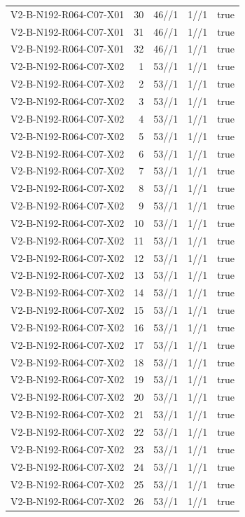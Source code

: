 {\begin{longtable}{lrrrr}
V2-B-N192-R064-C07-X01 & 30 & 46//1 & 1//1 & true \\
V2-B-N192-R064-C07-X01 & 31 & 46//1 & 1//1 & true \\
V2-B-N192-R064-C07-X01 & 32 & 46//1 & 1//1 & true \\
V2-B-N192-R064-C07-X02 & 1 & 53//1 & 1//1 & true \\
V2-B-N192-R064-C07-X02 & 2 & 53//1 & 1//1 & true \\
V2-B-N192-R064-C07-X02 & 3 & 53//1 & 1//1 & true \\
V2-B-N192-R064-C07-X02 & 4 & 53//1 & 1//1 & true \\
V2-B-N192-R064-C07-X02 & 5 & 53//1 & 1//1 & true \\
V2-B-N192-R064-C07-X02 & 6 & 53//1 & 1//1 & true \\
V2-B-N192-R064-C07-X02 & 7 & 53//1 & 1//1 & true \\
V2-B-N192-R064-C07-X02 & 8 & 53//1 & 1//1 & true \\
V2-B-N192-R064-C07-X02 & 9 & 53//1 & 1//1 & true \\
V2-B-N192-R064-C07-X02 & 10 & 53//1 & 1//1 & true \\
V2-B-N192-R064-C07-X02 & 11 & 53//1 & 1//1 & true \\
V2-B-N192-R064-C07-X02 & 12 & 53//1 & 1//1 & true \\
V2-B-N192-R064-C07-X02 & 13 & 53//1 & 1//1 & true \\
V2-B-N192-R064-C07-X02 & 14 & 53//1 & 1//1 & true \\
V2-B-N192-R064-C07-X02 & 15 & 53//1 & 1//1 & true \\
V2-B-N192-R064-C07-X02 & 16 & 53//1 & 1//1 & true \\
V2-B-N192-R064-C07-X02 & 17 & 53//1 & 1//1 & true \\
V2-B-N192-R064-C07-X02 & 18 & 53//1 & 1//1 & true \\
V2-B-N192-R064-C07-X02 & 19 & 53//1 & 1//1 & true \\
V2-B-N192-R064-C07-X02 & 20 & 53//1 & 1//1 & true \\
V2-B-N192-R064-C07-X02 & 21 & 53//1 & 1//1 & true \\
V2-B-N192-R064-C07-X02 & 22 & 53//1 & 1//1 & true \\
V2-B-N192-R064-C07-X02 & 23 & 53//1 & 1//1 & true \\
V2-B-N192-R064-C07-X02 & 24 & 53//1 & 1//1 & true \\
V2-B-N192-R064-C07-X02 & 25 & 53//1 & 1//1 & true \\
V2-B-N192-R064-C07-X02 & 26 & 53//1 & 1//1 & true \\

\end{longtable}}
